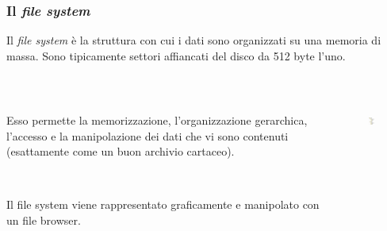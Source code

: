 \documentclass[handout]{beamer}
\begin{document}
\begin{frame}
\frametitle{Il \emph{file system}}
Il \emph{file system} è la \alert<1>{struttura con cui i dati sono organizzati su una memoria di massa}. Sono tipicamente settori affiancati del disco da 512 byte l'uno.\pause

~

\begin{columns}
  \begin{column}{.65\textwidth}
    Esso permette la memorizzazione, l'\alert<2>{organizzazione gerarchica}, l'accesso e la manipolazione dei dati che vi sono contenuti (esattamente come un buon archivio cartaceo).\pause
    
    ~
    
    Il file system viene rappresentato graficamente e manipolato con un \alert<3>{file browser}.
  \end{column}
  \begin{column}{.3\textwidth}
      \begin{figure}
        \includegraphics[width=\columnwidth]{img/albero.png}
      \end{figure}
  \end{column}
\end{columns}
\end{frame}
\end{document}
